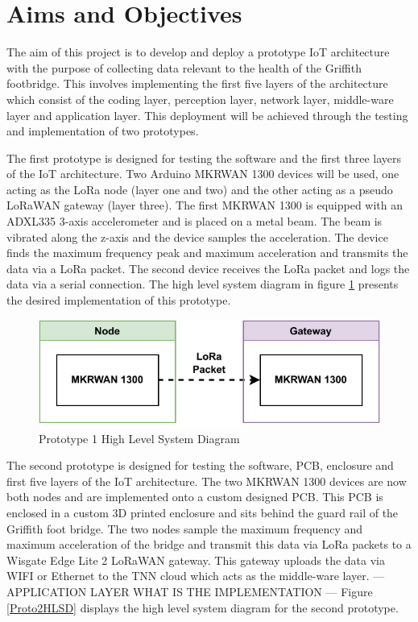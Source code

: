 \section{Aims and Objectives}

The aim of this project is to develop and deploy a prototype IoT architecture with the purpose of collecting data relevant to the health of the Griffith footbridge. This involves implementing the first five layers of the architecture which consist of the coding layer, perception layer, network layer, middle-ware layer and application layer. This deployment will be achieved through the testing and implementation of two prototypes.

The first prototype is designed for testing the software and the first three layers of the IoT architecture. Two Arduino MKRWAN 1300 devices will be used, one acting as the LoRa node (layer one and two) and the other acting as a pseudo LoRaWAN gateway (layer three). The first MKRWAN 1300 is equipped with an ADXL335 3-axis accelerometer and is placed on a metal beam. The beam is vibrated along the z-axis and the device samples the acceleration. The device finds the maximum frequency peak and maximum acceleration and transmits the data via a LoRa packet. The second device receives the LoRa packet and logs the data via a serial connection. The high level system diagram in figure \ref{Proto1HLSD} presents the desired implementation of this prototype. 

\begin{figure}[h]
	\centering
	\caption{Prototype 1 High Level System Diagram}
	\label{Proto1HLSD}
	\includegraphics[scale=1]{Sections/Introduction/Prototype-1-High-Level.drawio.pdf}
\end{figure}

		The second prototype is designed for testing the software, PCB, enclosure and first five layers of the IoT architecture. The two MKRWAN 1300 devices are now both nodes and are implemented onto a custom designed PCB. This PCB is enclosed in a custom 3D printed enclosure and sits behind the guard rail of the Griffith foot bridge. The two nodes sample the maximum frequency and maximum acceleration of the bridge and transmit this data via LoRa packets to a Wisgate Edge Lite 2 LoRaWAN gateway. This gateway uploads the data via WIFI or Ethernet to the TNN cloud which acts as the middle-ware layer. --- APPLICATION LAYER WHAT IS THE IMPLEMENTATION --- Figure \ref{Proto2HLSD}
displays the high level system diagram for the second prototype. 


